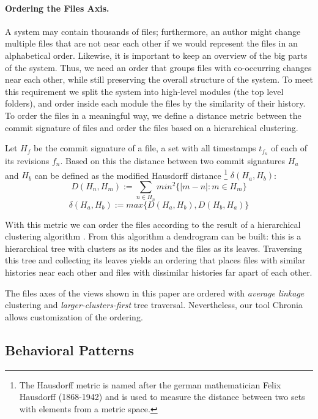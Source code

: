 \paragraph{Ordering the Files Axis.}
A system may contain thousands of files; furthermore, an author might change multiple files that are not near each other if we would represent the files in an alphabetical order. Likewise, it is important to keep an overview of the big parts of the system. Thus, we need an order that groups files with co-occurring changes near each other, while still preserving the overall structure of the system. To meet this requirement we split the system into high-level modules (\eg the top level folders), and order inside each module the files by the similarity of their history. To order the files in a meaningful way, we define a distance metric between the commit signature of files and order the files based on a hierarchical clustering.

Let $H_f$ be the commit signature of a file, a set with all timestamps $t_{f_n}$ of each of its revisions $f_n$. Based on this the distance between two commit signatures $H_a$ and $H_b$ can be defined as the modified Hausdorff distance \footnote{The Hausdorff metric is named after the german mathematician Felix Hausdorff (1868-1942) and is used to measure the distance between two sets with elements from a metric space.} $\delta(H_a,H_b)$:
\[
D(H_n,H_m) := \sum_{n \in H_n} min^2 \{ \vert m -n \vert : m \in H_m \}
\]
\[
\delta(H_a,H_b) := max \{ D(H_a,H_b), D(H_b,H_a) \}
\]

With this metric we can order the files according to the result of a hierarchical clustering algorithm \cite{Jain99a}. From this algorithm a dendrogram can be built: this is a hierarchical tree with clusters as its nodes and the files as its leaves. Traversing this tree and collecting its leaves yields an ordering that places files with similar histories near each other and files with dissimilar histories far apart of each other.

The files axes of the \omap views shown in this paper are ordered with \textit{average linkage} clustering and \textit{larger-clusters-first} tree traversal. Nevertheless, our tool Chronia allows customization of the ordering.

\subsection{Behavioral Patterns}

